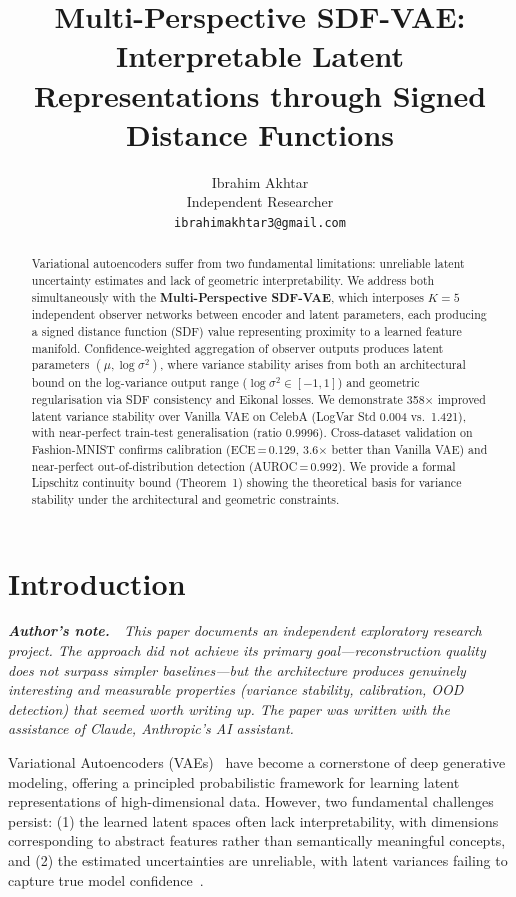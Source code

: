 \documentclass[10pt,twocolumn,letterpaper]{article}
\title{Multi-Perspective SDF-VAE: Interpretable Latent Representations through Signed Distance Functions}
\author{
Ibrahim Akhtar\\
Independent Researcher\\
{\tt\small ibrahimakhtar3@gmail.com}
}
\begin{document}
\maketitle

\begin{abstract}
Variational autoencoders suffer from two fundamental limitations: unreliable latent uncertainty estimates and lack of geometric interpretability. We address both simultaneously with the \textbf{Multi-Perspective SDF-VAE}, which interposes $K{=}5$ independent observer networks between encoder and latent parameters, each producing a signed distance function (SDF) value representing proximity to a learned feature manifold. Confidence-weighted aggregation of observer outputs produces latent parameters $(\mu, \log\sigma^2)$, where variance stability arises from both an architectural bound on the log-variance output range ($\log\sigma^2 \in [-1, 1]$) and geometric regularisation via SDF consistency and Eikonal losses. We demonstrate 358$\times$ improved latent variance stability over Vanilla VAE on CelebA (LogVar Std 0.004 vs.\ 1.421), with near-perfect train-test generalisation (ratio 0.9996). Cross-dataset validation on Fashion-MNIST confirms calibration (ECE\,=\,0.129, 3.6$\times$ better than Vanilla VAE) and near-perfect out-of-distribution detection (AUROC\,=\,0.992). We provide a formal Lipschitz continuity bound (Theorem~1) showing the theoretical basis for variance stability under the architectural and geometric constraints.
\end{abstract}

\section{Introduction}

\begin{tcolorbox}[colback=gray!8, colframe=gray!40, boxrule=0.4pt, arc=2pt, left=4pt, right=4pt, top=3pt, bottom=3pt]
\small\itshape
\textbf{Author's note.}~~This paper documents an independent exploratory research project. The approach did not achieve its primary goal---reconstruction quality does not surpass simpler baselines---but the architecture produces genuinely interesting and measurable properties (variance stability, calibration, OOD detection) that seemed worth writing up. The paper was written with the assistance of Claude, Anthropic's AI assistant.
\end{tcolorbox}
\medskip

Variational Autoencoders (VAEs)~\cite{kingma2013auto} have become a cornerstone of deep generative modeling, offering a principled probabilistic framework for learning latent representations of high-dimensional data. However, two fundamental challenges persist: (1) the learned latent spaces often lack interpretability, with dimensions corresponding to abstract features rather than semantically meaningful concepts, and (2) the estimated uncertainties are unreliable, with latent variances failing to capture true model confidence~\cite{gaussian_process_encoders}.
\end{document}
